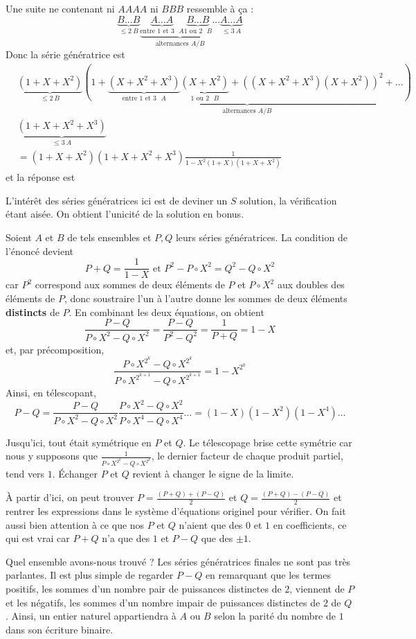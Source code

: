 \begin{sol}
Une suite ne contenant ni $AAAA$ ni $BBB$ ressemble à ça :
$$\underbrace{B\dots B}_{\le 2\ B}\underbrace{\underbrace{A\dots A}_{\text{entre $1$ et $3$ } A}\underbrace{B\dots B}_{\text{$1$ ou $2$ } B}\dots}_{\text{alternances $A$/$B$}}\underbrace{A\dots A}_{\le 3\ A}$$
Donc la série génératrice est
\begin{align*}
& \underbrace{(1 + X + X^2)}_{\le 2\ B}\underbrace{\left(1 + \underbrace{(X + X^2 + X^3)}_{\text{entre $1$ et $3$ } A}\underbrace{(X + X^2)}_{\text{$1$ ou $2$ } B} + \left((X + X^2 + X^3)(X + X^2)\right)^2 + \dots\right)}_{\text{alternances $A$/$B$}} \\
& \underbrace{(1 + X + X^2 + X^3)}_{\le 3\ A} \\
& = (1 + X + X^2)(1 + X + X^2 + X^3)\frac 1{1 - X^2(1 + X)(1 + X + X^2)}
\end{align*}
et la réponse est %
\end{sol}


\begin{sol}
L'intérêt des séries génératrices ici est de deviner un $S$ solution, la vérification étant aisée. On obtient l'unicité de la solution en bonus.

Soient $A$ et $B$ de tels ensembles et $P, Q$ leurs séries génératrices. La condition de l'énoncé devient
$$P + Q = \frac 1{1 - X} \text{ et } P^2 - P\circ X^2 = Q^2 - Q\circ X^2$$
car $P^2$ correspond aux sommes de deux éléments de $P$ et $P\circ X^2$ aux doubles des éléments de $P$, donc soustraire l'un à l'autre donne les sommes de deux éléments \textbf{distincts} de $P$. En combinant les deux équations, on obtient
$$\frac{P - Q}{P\circ X^2 - Q\circ X^2} = \frac{P - Q}{P^2 - Q^2} = \frac 1{P + Q} = 1 - X$$
et, par précomposition,
$$\frac{P\circ X^{2^k} - Q\circ X^{2^k}}{P\circ X^{2^{k + 1}} - Q\circ X^{2^{k + 1}}} = 1 - X^{2^k}$$
Ainsi, en télescopant,
$$P - Q = \frac{P - Q}{P\circ X^2 - Q\circ X^2} \frac{P\circ X^2 - Q\circ X^2}{P\circ X^4 - Q\circ X^4}\dots = (1 - X)(1 - X^2)(1 - X^4)\dots$$
\begin{rem}
Jusqu'ici, tout était symétrique en $P$ et $Q$. Le télescopage brise cette symétrie car nous y supposons que $\frac 1{P\circ X^{2^k} - Q\circ X^{2^k}}$, le dernier facteur de chaque produit partiel, tend vers $1$. Échanger $P$ et $Q$ revient à changer le signe de la limite.
\end{rem}
À partir d'ici, on peut trouver $P = \frac{(P + Q) + (P - Q)}2$ et $Q = \frac{(P + Q) - (P - Q)}2$ et rentrer les expressions dans le système d'équations originel pour vérifier. On fait aussi bien attention à ce que nos $P$ et $Q$ n'aient que des $0$ et $1$ en coefficients, ce qui est vrai car $P + Q$ n'a que des $1$ et $P - Q$ que des $\pm 1$.

Quel ensemble avons-nous trouvé ? Les séries génératrices finales ne sont pas très parlantes. Il est plus simple de regarder $P - Q$ en remarquant que les termes positifs, les sommes d'un nombre pair de puissances distinctes de $2$, viennent de $P$ et les négatifs, les sommes d'un nombre impair de puissances distinctes de $2$ de $Q$. Ainsi, un entier naturel appartiendra à $A$ ou $B$ selon la parité du nombre de $1$ dans son écriture binaire.
\end{sol}


